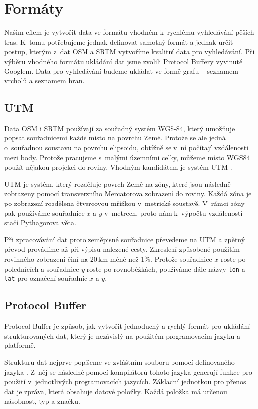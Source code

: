 \chapter{Formáty}
Našim cílem je vytvořit data ve formátu vhodném k~rychlému vyhledávání pěších
tras. K~tomu potřebujeme jednak definovat samotný formát a jednak určit postup, kterým z~dat 
OSM a SRTM vytvoříme kvalitní data pro vyhledávání. Při výběru vhodného formátu
ukládání dat jsme zvolili Protocol Buffery \cite{pbfweb} vyvinuté Googlem. Data
pro vyhledávání budeme ukládat ve formě grafu -- seznamem vrcholů a seznamem hran.

\section{UTM}
Data OSM i SRTM používají za souřadný systém WGS-84, který umožňuje popsat
souřadnicemi každé místo na povrchu Země. Protože se ale jedná o~souřadnou
soustavu na povrchu elipsoidu, obtížně se v~ní počítají vzdálenosti mezi body.
Protože pracujeme s~malými územními celky, můžeme místo WGS84 použít nějakou
projekci do roviny. Vhodným kandidátem je systém UTM \cite{utmnorma}.

UTM je systém, který rozděluje povrch Země na zóny, které jsou následně
zobrazeny pomocí transverzního Mercatorova zobrazení do roviny. Každá zóna je po
zobrazení rozdělena čtvercovou mřížkou v~metrické soustavě. V~rámci zóny pak
používáme souřadnice $x$ a $y$ v~metrech, proto nám k~výpočtu vzdáleností stačí
Pythagorova věta.

Při zpracovávání dat proto zeměpisné souřadnice převedeme na UTM a zpětný převod
provádíme až při výpisu nalezené cesty. Zkreslení způsobené použitím rovinného
zobrazení činí na 20\,km méně než 1\%. Protože souřadnice $x$ roste po
polednících a souřadnice $y$ roste po rovnoběžkách, používáme dále názvy
\verb|lon| a \verb|lat| pro označení souřadnic $x$ a $y$.

\section{Protocol Buffer}
Protocol Buffer je způsob, jak vytvořit jednoduchý a rychlý formát pro ukládání
strukturovaných dat, který je nezávislý na použitém programovacím jazyku a
platformě. 

Strukturu dat nejprve popíšeme ve zvláštním souboru pomocí definovaného
jazyka \cite{pbfspec}. Z~něj se následně pomocí kompilátorů tohoto jazyka
generují funkce pro použití v~jednotlivých programovacích jazycích. Základní
jednotkou pro přenos dat je zpráva, která obsahuje datové položky. Každá položka
má určenou násobnost, typ a značku.

